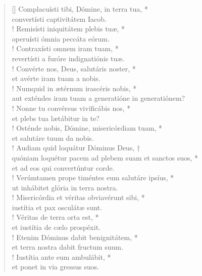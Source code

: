 \begin{verse}[\versewidth]
Complacuísti tibi, Dómine, in terra tua, *\\
convertísti captivitátem Iacob.\\!
\vin Remisísti iniquitátem plebis tuæ, *\\
\vin operuísti ómnia peccáta eórum.\\!
Contraxísti omnem iram tuam, *\\
revertísti a furóre indignatiónis tuæ.\\!
\vin Convérte nos, Deus, salutáris noster, *\\
\vin et avérte iram tuam a nobis.\\!
Numquid in ætérnum irascéris nobis, *\\
aut exténdes iram tuam a generatióne in generatiónem?\\!
\vin Nonne tu convérsus vivificábis nos, *\\
\vin et plebs tua lætábitur in te?\\!
Osténde nobis, Dómine, misericórdiam tuam, *\\
et salutáre tuum da nobis.\\!
\vin Audiam quid loquátur Dóminus Deus, †\\
\vin quóniam loquétur pacem ad plebem suam et sanctos suos, *\\
\vin et ad eos qui convertúntur corde.\\!
Verúmtamen prope timéntes eum salutáre ipsíus, *\\
ut inhábitet glória in terra nostra.\\!
\vin Misericórdia et véritas obviavérunt sibi, *\\
\vin iustítia et pax osculátæ sunt.\\!
Véritas de terra orta est, *\\
et iustítia de cælo prospéxit.\\!
\vin Etenim Dóminus dabit benignitátem, *\\
\vin et terra nostra dabit fructum suum.\\!
Iustítia ante eum ambulábit, *\\
et ponet in via gressus suos.\\
\end{verse}
\vspace{1cm}


